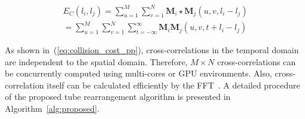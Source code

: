 \documentclass[11pt]{hyu_thesis}
\begin{document}
\begin{equation}
\label{eq:collision_cost_pp}
\begin{aligned}
E_C(l_i, l_j) = \sum_{u=1}^{M} \sum_{v=1}^{N} \textbf{M}_{i} \star \textbf{M}_{j}(u, v, l_i - l_j)\\
= \sum_{u=1}^{M} \sum_{v=1}^{N} \sum_{t=-\infty}^{\infty} \textbf{M}_{i}\textbf{M}_{j}(u, v, t + l_i - l_j)
\end{aligned}
\end{equation}

As shown in~(\ref{eq:collision_cost_pp}), cross-correlations in the temporal domain are independent to the spatial domain. Therefore, $M \times N$ cross-correlations can be concurrently computed using multi-cores or GPU environments. Also, cross-correlation itself can be calculated efficiently by the FFT~\cite{Oppenheim2009}. A detailed procedure of the proposed tube rearrangement algorithm is presented in Algorithm~\ref{alg:proposed}.
\end{document}
